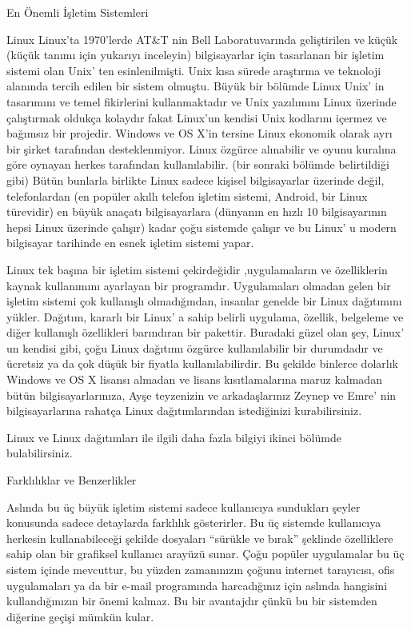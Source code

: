 \documentclass[10pt,a5paper]{book}
\begin{document}
\begin{section}{En Önemli İşletim Sistemleri}
\begin{subsection}{Linux}
Linux'ta 1970'lerde AT\&T nin Bell Laboratuvarında geliştirilen ve küçük (küçük tanımı için yukarıyı inceleyin) bilgisayarlar için tasarlanan bir işletim sistemi olan Unix' ten esinlenilmişti. Unix kısa sürede araştırma ve teknoloji alanında tercih edilen bir sistem olmuştu. Büyük bir bölümde Linux Unix' in tasarımını ve temel fikirlerini kullanmaktadır ve Unix yazılımını Linux üzerinde çalıştırmak oldukça kolaydır fakat Linux'un kendisi Unix kodlarını içermez ve bağımsız bir projedir. Windows ve OS X'in tersine Linux ekonomik olarak ayrı bir şirket tarafından desteklenmiyor. Linux özgürce alınabilir ve oyunu kuralına göre oynayan herkes tarafından kullanılabilir. (bir sonraki bölümde belirtildiği gibi) Bütün bunlarla birlikte Linux sadece kişisel bilgisayarlar üzerinde değil, telefonlardan (en popüler akıllı telefon işletim sistemi, Android, bir Linux türevidir) en büyük anaçatı bilgisayarlara (dünyanın en hızlı 10 bilgisayarının hepsi Linux üzerinde çalışır) kadar çoğu sistemde çalışır ve bu Linux' u modern bilgisayar tarihinde en esnek işletim sistemi yapar.

Linux tek başına bir işletim sistemi çekirdeğidir ,uygulamaların ve özelliklerin kaynak kullanımını ayarlayan bir programdır. Uygulamaları olmadan gelen bir işletim sistemi çok kullanışlı olmadığından, insanlar genelde bir Linux dağıtımını yükler. Dağıtım, kararlı bir Linux' a sahip belirli uygulama, özellik, belgeleme ve diğer kullanışlı özellikleri barındıran bir pakettir. Buradaki güzel olan şey, Linux' un kendisi gibi, çoğu Linux dağıtımı özgürce kullanılabilir bir durumdadır ve ücretsiz ya da çok düşük bir fiyatla kullanılabilirdir. Bu şekilde binlerce dolarlık Windows ve OS X lisansı almadan ve lisans kısıtlamalarına maruz kalmadan bütün bilgisayarlarınıza, Ayşe teyzenizin ve arkadaşlarınız Zeynep ve Emre' nin bilgisayarlarına rahatça Linux dağıtımlarından istediğinizi kurabilirsiniz.

Linux ve Linux dağıtımları ile ilgili daha fazla bilgiyi ikinci bölümde bulabilirsiniz.
\end{subsection}
\begin{subsection}{Farklılıklar ve Benzerlikler}

Aslında bu üç büyük işletim sistemi sadece kullanıcıya sundukları şeyler konusunda sadece detaylarda farklılık gösterirler. Bu üç sistemde kullanıcıya herkesin kullanabileceği şekilde dosyaları “sürükle ve bırak” şeklinde özelliklere sahip olan bir grafiksel kullanıcı arayüzü sunar. Çoğu popüler uygulamalar bu üç sistem içinde mevcuttur, bu yüzden zamanınızın çoğunu internet tarayıcısı, ofis uygulamaları ya da bir e-mail programında harcadığınız için aslında hangisini kullandığınızın bir önemi kalmaz. Bu bir avantajdır çünkü bu bir sistemden diğerine geçişi mümkün kular.


\end{subsection}
\end{section}
\end{document}
